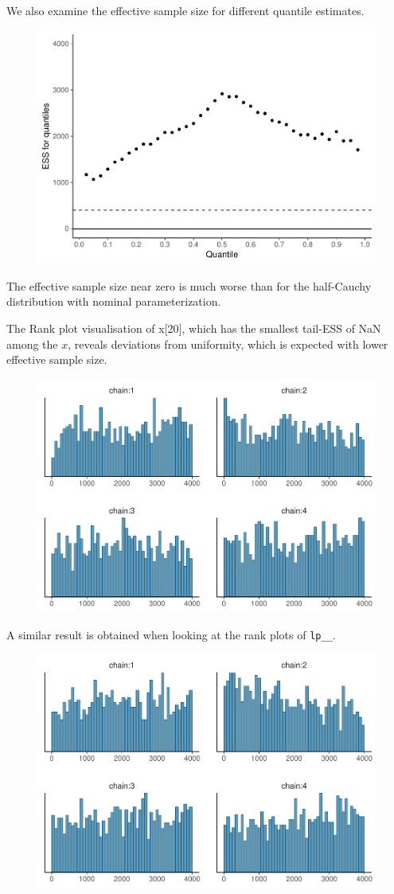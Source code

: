 \documentclass[american,]{article}
\begin{document}
We also examine the effective sample size for different quantile
estimates.

\begin{figure}[tp]
  \centering
  \includegraphics[width=0.6\linewidth]{graphics/quantile-ess-fit-half-reparam-1.pdf}
\end{figure}

The effective sample size near zero is much worse than for the
half-Cauchy distribution with nominal parameterization.

The Rank plot visualisation of x{[}20{]}, which has the smallest
tail-ESS of NaN among the \(x\), reveals deviations from uniformity,
which is expected with lower effective sample size.

\begin{figure}[tp]
  \centering
  \includegraphics[width=0.6\linewidth]{graphics/hist-fit-half-reparam-1.pdf}
\end{figure}

A similar result is obtained when looking at the rank plots of
\texttt{lp\_\_}.

\begin{figure}[tp]
  \centering
  \includegraphics[width=0.6\linewidth]{graphics/hist-fit-half-reparam-lp-1.pdf}
\end{figure}
\end{document}
